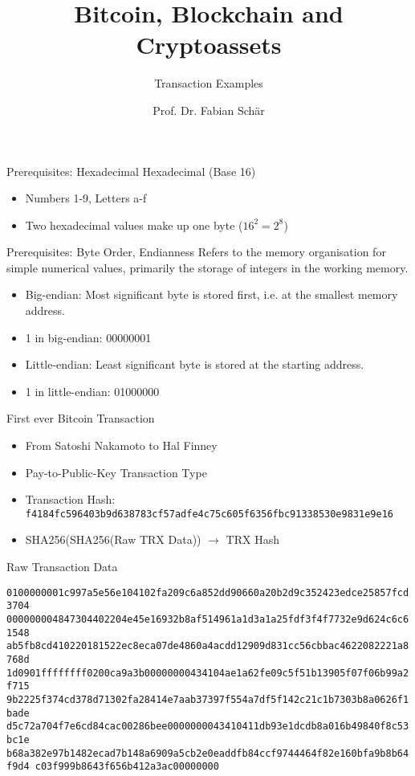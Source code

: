 \documentclass[]{beamer}
\title{Bitcoin, Blockchain and Cryptoassets}
\subtitle{Transaction Examples}
\author{Prof. Dr. Fabian Schär}
\institute{University of Basel}
\begin{document}
\thispagestyle{empty}
\begin{frame}[noframenumbering]
	\titlepage
\end{frame}

\begin{frame}{Prerequisites: Hexadecimal}
Hexadecimal (Base 16)
\vspace{1em}
\begin{itemize}
	\item Numbers 1-9, Letters a-f
	\item Two hexadecimal values make up one byte ($16^{2} = 2^{8}$)
\end{itemize}
\end{frame}


\begin{frame}{Prerequisites: Byte Order, Endianness}
Refers to the memory organisation for simple numerical values, primarily the storage of integers in the working memory.
\vspace{1em}
\begin{itemize}
	\item Big-endian: Most significant byte is stored first, i.e. at the smallest memory address.
	\item 1 in big-endian: 00000001
	\item Little-endian: Least significant byte is stored at the starting address.
	\item 1 in little-endian: 01000000
\end{itemize}
\end{frame}


\begin{frame}{First ever Bitcoin Transaction}
\begin{itemize}
\item From Satoshi Nakamoto to Hal Finney
\item Pay-to-Public-Key Transaction Type
\item Transaction Hash: \\
{\scriptsize \texttt{f4184fc596403b9d638783cf57adfe4c75c605f6356fbc91338530e9831e9e16}}
\item SHA256(SHA256(Raw TRX Data)) $\rightarrow$ TRX Hash
\end{itemize}
\end{frame}


\begin{frame}{Raw Transaction Data}
\begin{scriptsize}
\texttt{0100000001c997a5e56e104102fa209c6a852dd90660a20b2d9c352423edce25857fcd3704
000000004847304402204e45e16932b8af514961a1d3a1a25fdf3f4f7732e9d624c6c61548
ab5fb8cd410220181522ec8eca07de4860a4acdd12909d831cc56cbbac4622082221a8768d
1d0901ffffffff0200ca9a3b00000000434104ae1a62fe09c5f51b13905f07f06b99a2f715
9b2225f374cd378d71302fa28414e7aab37397f554a7df5f142c21c1b7303b8a0626f1bade
d5c72a704f7e6cd84cac00286bee0000000043410411db93e1dcdb8a016b49840f8c53bc1e
b68a382e97b1482ecad7b148a6909a5cb2e0eaddfb84ccf9744464f82e160bfa9b8b64f9d4
c03f999b8643f656b412a3ac00000000}
\end{scriptsize}
\end{frame}
\end{document}
